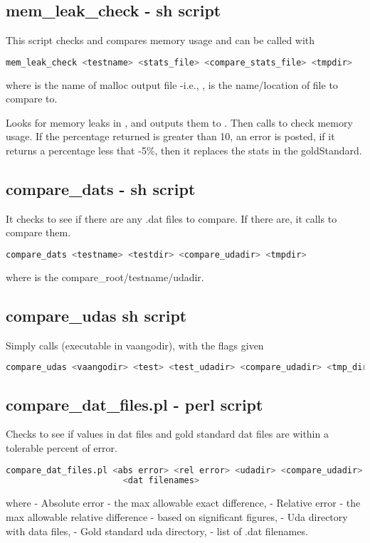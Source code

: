 \subsection{mem\_leak\_check - sh script}
This script checks and compares memory usage and can be called with
\begin{lstlisting}[language=sh, backgroundcolor=\color{background}]
  mem_leak_check <testname> <stats_file> <compare_stats_file> <tmpdir>
\end{lstlisting}
where  is the name of malloc output file -i.e., ,
 is the name/location of file to compare to.

Looks for memory leaks in , and outputs them to 
.  Then calls  to check
memory usage. If the percentage returned is greater than 10, an error is
posted, if it returns a percentage less that -5\%, then it replaces the stats
in the goldStandard.

\subsection{compare\_dats -  sh script}
It checks to see if there are any .dat files to compare.  If there are,
it calls  to compare them.
\begin{lstlisting}[language=sh, backgroundcolor=\color{background}]
  compare_dats <testname> <testdir> <compare_udadir> <tmpdir>
\end{lstlisting}
where  is the compare\_root/testname/udadir.

\subsection{compare\_udas  sh script}
Simply calls  (executable in vaangodir), with the flags given
\begin{lstlisting}[language=sh, backgroundcolor=\color{background}]
  compare_udas <vaangodir> <test> <test_udadir> <compare_udadir> <tmp_dir> <flags>
\end{lstlisting}

\subsection{compare\_dat\_files.pl - perl script}
Checks to see if values in dat files and gold standard dat files are within
a tolerable percent of error.
\begin{lstlisting}[language=sh, backgroundcolor=\color{background}]
  compare_dat_files.pl <abs error> <rel error> <udadir> <compare_udadir> 
                       <dat filenames>
\end{lstlisting}
where  - Absolute error - the max allowable exact difference,
 - Relative error - the max allowable relative difference - 
based on significant figures,
          - Uda directory with data files,
  - Gold standard uda directory,
   - list of .dat filenames.


